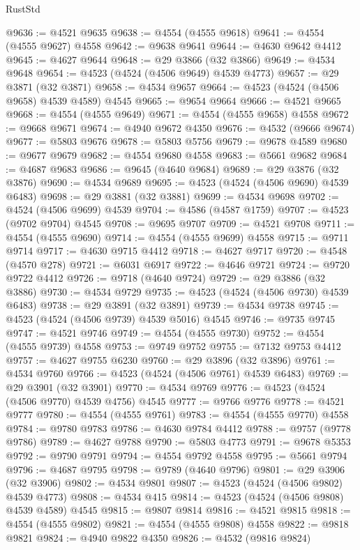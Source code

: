 \begin{lexlean}{RustStd}
\begin{coremodule}
@9636 := @4521 @9635
@9638 := @4554 (@4555 @9618)
@9641 := @4554 (@4555 @9627) @4558
@9642 := @9638 @9641
@9644 := @4630 @9642 @4412
@9645 := @4627 @9644
@9648 := @29 @3866 (@32 @3866)
@9649 := @4534 @9648
@9654 := @4523 (@4524 (@4506 @9649) @4539 @4773)
@9657 := @29 @3871 (@32 @3871)
@9658 := @4534 @9657
@9664 := @4523 (@4524 (@4506 @9658) @4539 @4589) @4545
@9665 := @9654 @9664
@9666 := @4521 @9665
@9668 := @4554 (@4555 @9649)
@9671 := @4554 (@4555 @9658) @4558
@9672 := @9668 @9671
@9674 := @4940 @9672 @4350
@9676 := @4532 (@9666 @9674)
@9677 := @5803 @9676
@9678 := @5803 @5756
@9679 := @9678 @4589
@9680 := @9677 @9679
@9682 := @4554 @9680 @4558
@9683 := @5661 @9682
@9684 := @4687 @9683
@9686 := @9645 (@4640 @9684)
@9689 := @29 @3876 (@32 @3876)
@9690 := @4534 @9689
@9695 := @4523 (@4524 (@4506 @9690) @4539 @6483)
@9698 := @29 @3881 (@32 @3881)
@9699 := @4534 @9698
@9702 := @4524 (@4506 @9699) @4539
@9704 := @4586 (@4587 @1759)
@9707 := @4523 (@9702 @9704) @4545
@9708 := @9695 @9707
@9709 := @4521 @9708
@9711 := @4554 (@4555 @9690)
@9714 := @4554 (@4555 @9699) @4558
@9715 := @9711 @9714
@9717 := @4630 @9715 @4412
@9718 := @4627 @9717
@9720 := @4548 (@4570 @278)
@9721 := @6031 @6917
@9722 := @4646 @9721
@9724 := @9720 @9722 @4412
@9726 := @9718 (@4640 @9724)
@9729 := @29 @3886 (@32 @3886)
@9730 := @4534 @9729
@9735 := @4523 (@4524 (@4506 @9730) @4539 @6483)
@9738 := @29 @3891 (@32 @3891)
@9739 := @4534 @9738
@9745 := @4523 (@4524 (@4506 @9739) @4539 @5016) @4545
@9746 := @9735 @9745
@9747 := @4521 @9746
@9749 := @4554 (@4555 @9730)
@9752 := @4554 (@4555 @9739) @4558
@9753 := @9749 @9752
@9755 := @7132 @9753 @4412
@9757 := @4627 @9755 @6230
@9760 := @29 @3896 (@32 @3896)
@9761 := @4534 @9760
@9766 := @4523 (@4524 (@4506 @9761) @4539 @6483)
@9769 := @29 @3901 (@32 @3901)
@9770 := @4534 @9769
@9776 := @4523 (@4524 (@4506 @9770) @4539 @4756) @4545
@9777 := @9766 @9776
@9778 := @4521 @9777
@9780 := @4554 (@4555 @9761)
@9783 := @4554 (@4555 @9770) @4558
@9784 := @9780 @9783
@9786 := @4630 @9784 @4412
@9788 := @9757 (@9778 @9786)
@9789 := @4627 @9788
@9790 := @5803 @4773
@9791 := @9678 @5353
@9792 := @9790 @9791
@9794 := @4554 @9792 @4558
@9795 := @5661 @9794
@9796 := @4687 @9795
@9798 := @9789 (@4640 @9796)
@9801 := @29 @3906 (@32 @3906)
@9802 := @4534 @9801
@9807 := @4523 (@4524 (@4506 @9802) @4539 @4773)
@9808 := @4534 @415
@9814 := @4523 (@4524 (@4506 @9808) @4539 @4589) @4545
@9815 := @9807 @9814
@9816 := @4521 @9815
@9818 := @4554 (@4555 @9802)
@9821 := @4554 (@4555 @9808) @4558
@9822 := @9818 @9821
@9824 := @4940 @9822 @4350
@9826 := @4532 (@9816 @9824)

\end{coremodule}
\end{lexlean}
